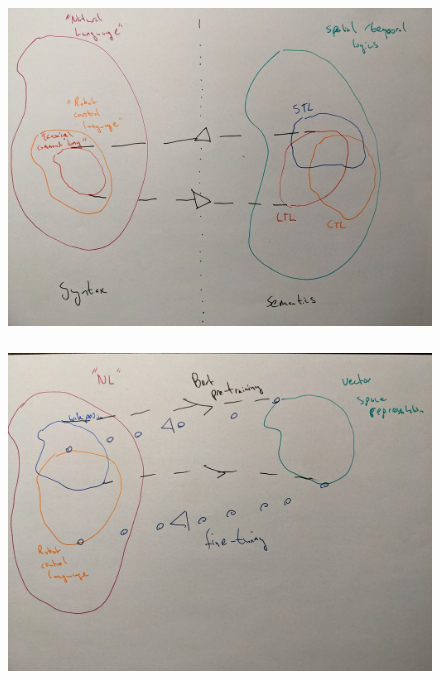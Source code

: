 \documentclass{beamer}
\begin{document}
\begin{frame}
\frametitle{}
\begin{figure}
\hspace*{-3mm}%
   \includegraphics[width= \paperwidth]{pics/one.jpg}
\end{figure}
\end{frame}

\begin{frame}
\frametitle{}
\begin{figure}
\hspace*{-3mm}%
   \includegraphics[width= \paperwidth]{pics/two.jpg}
\end{figure}
\end{frame}
\end{document}
